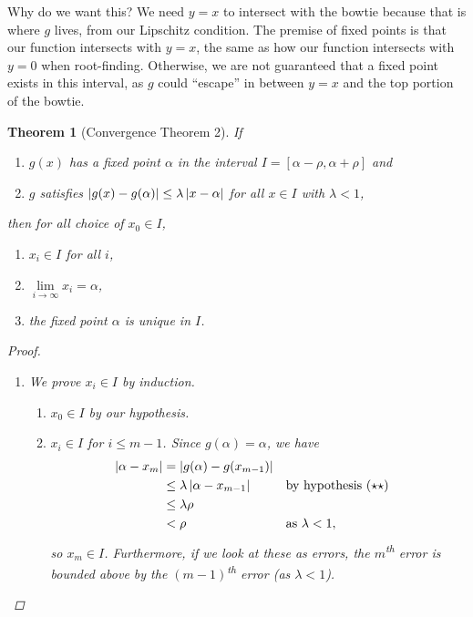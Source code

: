 \documentclass[12pt,letterpaper,DIV=11]{scrartcl}
\theoremstyle{plain}
\newtheorem{theorem}{Theorem}[section]
\theoremstyle{definition}
\theoremstyle{remark}
\begin{document}
  Why do we want this?
  We need $y = x$ to intersect with the bowtie because that is where $g$ lives, from our Lipschitz condition.
  The premise of fixed points is that our function intersects with $y = x$, the same as how our function intersects with $y = 0$ when root-finding.
  Otherwise, we are not guaranteed that a fixed point exists in this interval, as $g$ could \enquote{escape} in between $y = x$ and the top portion of the bowtie.

  \begin{theorem}[Convergence Theorem 2]\label{thm:convergence2}
    If \begin{enumerate}
      \item[$(\star)$] $g(x)$ has a fixed point $\alpha$ in the interval $I = [\alpha - \rho, \alpha + \rho]$ and
      \item[$(\star\star)$] $g$ satisfies $\left\lvert g(x) - g(\alpha)\right\rvert \leq \lambda \left\lvert x - \alpha\right\rvert$ for all $x \in I$ with $\lambda < 1$,
      \end{enumerate} then for all choice of $x_0 \in I$, \begin{enumerate}
      \item $x_i \in I$ for all $i$,
      \item $\lim\limits_{i \to \infty} x_i = \alpha$,
      \item the fixed point $\alpha$ is unique in $I$.
    \end{enumerate}
    \begin{proof}\leavevmode
      \begin{enumerate}
        \item We prove $x_i \in I$ by induction. \begin{enumerate}
          \item $x_0 \in I$ by our hypothesis.
          \item $x_i \in I$ for $i \leq m - 1$.
            Since $g(\alpha) = \alpha$, we have \begin{align*}
              \left\lvert\alpha - x_m\right\rvert &= \left\lvert g(\alpha) - g(x_{m - 1})\right\rvert \\
                                 &\leq \lambda \left\lvert\alpha - x_{m - 1}\right\rvert && \text{by hypothesis $(\star\star)$} \\
                                 &\leq \lambda \rho \\
                                 &< \rho && \text{as $\lambda < 1$},
            \end{align*} so $x_m \in I$.
            Furthermore, if we look at these as errors, the $m$\textsuperscript{th} error is bounded above by the $(m - 1)$\textsuperscript{th} error (as $\lambda < 1$).
        \end{enumerate}


\end{enumerate}
\end{proof}
\end{theorem}
\end{document}
